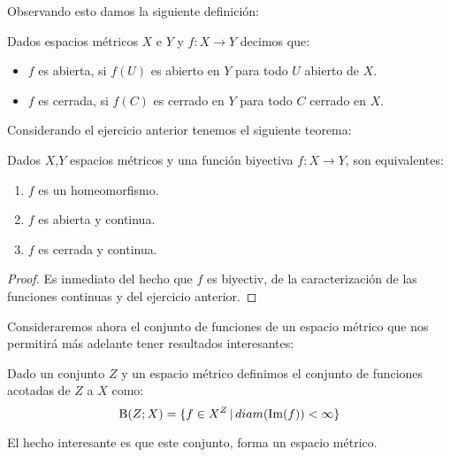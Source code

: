 \documentclass[12pt,a4paper]{book}
\begin{document}
Observando esto damos la siguiente definición:
\begin{defi} Dados espacios métricos $X$ e $Y$ y $f:X\rightarrow Y$ decimos que:
\begin{itemize}
\item $f$ es abierta, si $f(U)$ es abierto en $Y$ para todo $U$ abierto de $X$.
\item $f$ es cerrada, si $f(C)$ es cerrado en $Y$ para todo $C$ cerrado en $X$.
\end{itemize}
\end{defi}
Considerando el ejercicio anterior tenemos el siguiente teorema:
\begin{teo} Dados $X$,$Y$ espacios métricos y una función biyectiva $f:X \rightarrow Y$, son equivalentes:
\begin{enumerate}
\item $f$ es un homeomorfismo.
\item $f$ es abierta y continua.
\item $f$ es cerrada y continua.
\end{enumerate}
\begin{proof}
Es inmediato del hecho que $f$ es biyectiv, de la caracterización de las funciones continuas y del ejercicio anterior.
\end{proof}
\end{teo}
Consideraremos ahora el conjunto de funciones de un espacio métrico que nos permitirá más adelante tener resultados interesantes:
\begin{defi} Dado un conjunto $Z$ y un espacio métrico definimos el conjunto de funciones acotadas de $Z$ a $X$ como:
$$ \mathrm{B}(Z;X) = \{ f \in X^Z \,\vert\, diam(\mbox{Im}(f)) < \infty \}$$
\end{defi}
El hecho interesante es que este conjunto, forma un espacio métrico.
\end{document}
